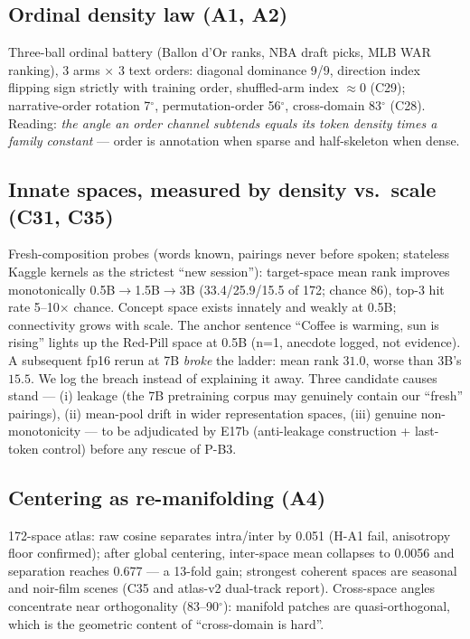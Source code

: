 \documentclass[11pt]{article}
\begin{document}
\subsection{Ordinal density law (A1, A2)}
Three-ball ordinal battery (Ballon d'Or ranks, NBA draft picks, MLB WAR ranking),
3 arms $\times$ 3 text orders: diagonal dominance 9/9, direction index flipping
sign strictly with training order, shuffled-arm index $\approx 0$ (C29);
narrative-order rotation 7$^\circ$, permutation-order 56$^\circ$, cross-domain 83$^\circ$
(C28). Reading: \emph{the angle an order channel subtends equals its token density
times a family constant} --- order is annotation when sparse and half-skeleton when dense.

\subsection{Innate spaces, measured by density vs.\ scale (C31, C35)}
Fresh-composition probes (words known, pairings never before spoken; stateless
Kaggle kernels as the strictest ``new session''): target-space mean rank improves
monotonically 0.5B$\to$1.5B$\to$3B (33.4/25.9/15.5 of 172; chance 86), top-3 hit rate
5--10$\times$ chance. Concept space exists innately and weakly at 0.5B; connectivity
grows with scale. The anchor sentence ``Coffee is warming, sun is rising'' lights up
the Red-Pill space at 0.5B (n=1, anecdote logged, not evidence).
A subsequent fp16 rerun at 7B \emph{broke} the ladder: mean rank $31.0$, worse than 3B's $15.5$. We log the breach instead of explaining it away. Three candidate causes stand --- (i) leakage (the 7B pretraining corpus may genuinely contain our ``fresh'' pairings), (ii) mean-pool drift in wider representation spaces, (iii) genuine non-monotonicity --- to be adjudicated by E17b (anti-leakage construction + last-token control) before any rescue of P-B3.

\subsection{Centering as re-manifolding (A4)}
172-space atlas: raw cosine separates intra/inter by 0.051 (H-A1 fail, anisotropy
floor confirmed); after global centering, inter-space mean collapses to 0.0056 and
separation reaches 0.677 --- a 13-fold gain; strongest coherent spaces are seasonal
and noir-film scenes (C35 and atlas-v2 dual-track report). Cross-space angles
concentrate near orthogonality (83--90$^\circ$): manifold patches are quasi-orthogonal,
which is the geometric content of ``cross-domain is hard''.
\end{document}
